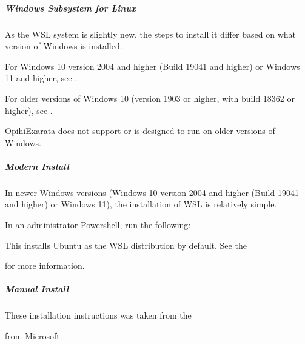 \documentclass[letterpaper,11pt,english]{sphinxmanual}
\begin{document}
\subparagraph{Windows Subsystem for Linux}
\label{\detokenize{technical/installation/windows:windows-subsystem-for-linux}}
\sphinxAtStartPar
As the WSL system is slightly new, the steps to install it differ based on
what version of Windows is installed.

\sphinxAtStartPar
For Windows 10 version 2004 and higher (Build 19041 and higher) or Windows 11
and higher, see {\hyperref[\detokenize{technical/installation/windows:modern-install}]{}}.

\sphinxAtStartPar
For older versions of Windows 10 (version 1903 or higher, with build 18362 or
higher), see {\hyperref[\detokenize{technical/installation/windows:manual-install}]{}}.

\sphinxAtStartPar
OpihiExarata does not support or is designed to run on older versions of
Windows.


\subparagraph{Modern Install}
\label{\detokenize{technical/installation/windows:modern-install}}
\sphinxAtStartPar
In newer Windows versions (Windows 10 version 2004 and higher (Build 19041
and higher) or Windows 11), the installation of WSL is relatively simple.

\sphinxAtStartPar
In an administrator Powershell, run the following:

\begin{sphinxVerbatim}[commandchars=\\\{\}]
 
\end{sphinxVerbatim}

\sphinxAtStartPar
This installs Ubuntu as the WSL distribution by default. See the
%
\begin{footnote}[33]\sphinxAtStartFootnote
{}
%
\end{footnote} for more information.


\subparagraph{Manual Install}
\label{\detokenize{technical/installation/windows:manual-install}}
\sphinxAtStartPar
These installation instructions was taken from the %
\begin{footnote}[34]\sphinxAtStartFootnote
{}
%
\end{footnote}
from Microsoft.
\end{document}
